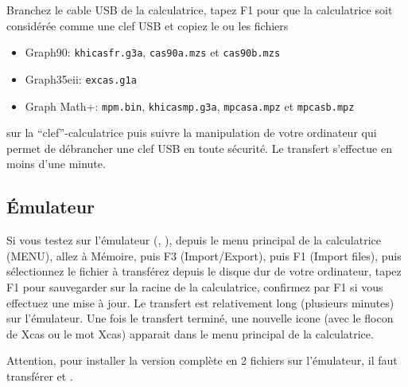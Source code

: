 \documentclass{article}
\begin{document}
\begin{giacjshere}
Branchez le cable USB de la calculatrice, tapez F1 pour que la
calculatrice soit consid\'er\'ee comme une clef USB et copiez le ou
les fichiers 
\begin{itemize}
\item Graph90: \verb|khicasfr.g3a|, \verb|cas90a.mzs| 
et \verb|cas90b.mzs| 
\item Graph35eii: \verb|excas.g1a| 
\item Graph Math+: \verb|mpm.bin|, \verb|khicasmp.g3a|,
\verb|mpcasa.mpz| et \verb|mpcasb.mpz|
\end{itemize}
sur la ``clef''-calculatrice puis suivre
la manipulation de votre ordinateur qui permet de d\'ebrancher
une clef USB en toute s\'ecurit\'e. Le transfert s'effectue en 
moins d'une minute. 



\subsection{\'Emulateur}
Si vous testez sur l'\'emulateur
(,
), 
depuis le menu principal de la calculatrice (MENU), allez \`a M\'emoire,
puis F3 (Import/Export), puis F1 (Import files),
puis s\'electionnez le fichier \`a
transf\'erez depuis le disque dur de votre ordinateur, tapez
F1 pour sauvegarder sur la racine de la calculatrice, confirmez par F1 
si vous effectuez une mise \`a jour. Le transfert est relativement
long (plusieurs minutes) sur l'\'emulateur. 
Une fois le transfert termin\'e, une nouvelle icone (avec le flocon
de Xcas ou le mot Xcas) apparait dans le menu principal de la
calculatrice.

Attention, pour installer la version
compl\`ete en 2 fichiers sur l'\'emulateur, il faut transf\'erer
et 
.


\end{giacjshere}
\end{document}
